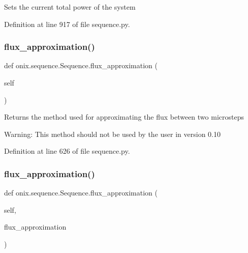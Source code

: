 \begin{DoxyVerb}Sets the current total power of the system
\end{DoxyVerb}
 

Definition at line 917 of file sequence.\+py.

\mbox{\label{classonix_1_1sequence_1_1Sequence_a540435e404fb702638ef020d1f5d79eb}} 
\subsubsection{\texorpdfstring{flux\+\_\+approximation()}{flux\_approximation()}\hspace{0.1cm}{\footnotesize\ttfamily [1/2]}}
{\footnotesize\ttfamily def onix.\+sequence.\+Sequence.\+flux\+\_\+approximation (\begin{DoxyParamCaption}\item[{}]{self }\end{DoxyParamCaption})}

\begin{DoxyVerb}Returns the method used for approximating the flux between two microsteps

Warning: This method should not be used by the user in version 0.10\end{DoxyVerb}
 

Definition at line 626 of file sequence.\+py.

\mbox{\label{classonix_1_1sequence_1_1Sequence_a0705ea21972d5d28041c449f678b93ae}} 
\subsubsection{\texorpdfstring{flux\+\_\+approximation()}{flux\_approximation()}\hspace{0.1cm}{\footnotesize\ttfamily [2/2]}}
{\footnotesize\ttfamily def onix.\+sequence.\+Sequence.\+flux\+\_\+approximation (\begin{DoxyParamCaption}\item[{}]{self,  }\item[{}]{flux\+\_\+approximation }\end{DoxyParamCaption})}

